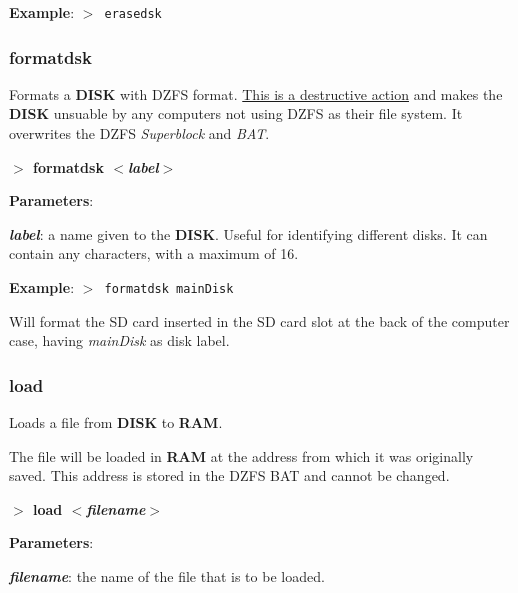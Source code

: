 \documentclass[a4paper,11pt]{article}
\begin{document}
        \textbf{Example}: \texttt{$>$ erasedsk}

        \subsubsection{{\color{blue}formatdsk}}
        Formats a \textbf{DISK} with DZFS format. \underline{This is a
        destructive action} and makes the \textbf{DISK} unsuable by any
        computers not using DZFS as their file system. It overwrites the DZFS
        \textit{Superblock} and \textit{BAT}.

        \hspace{1.9cm}\textbf{$>$ formatdsk \textit{$<$label$>$}}

        \textbf{Parameters}:

        \hspace{1cm}\textbf{\textit{label}}: a name given to the \textbf{DISK}.
        Useful for identifying different disks. It can contain any characters,
        with a maximum of 16.

        \textbf{Example}: \texttt{$>$ formatdsk mainDisk}

        Will format the SD card inserted in the SD card slot at the back of the
        computer case, having \textit{mainDisk} as disk label.

        \subsubsection{{\color{blue}load}}
        Loads a file from \textbf{DISK} to \textbf{RAM}.
        
        The file will be loaded in \textbf{RAM} at the address from which it was
        originally saved. This address is stored in the DZFS BAT and cannot be
        changed. 

        \hspace{1.9cm}\textbf{$>$ load \textit{$<$filename$>$}}

        \textbf{Parameters}:

        \hspace{1cm}\textbf{\textit{filename}}: the name of the file that is to
        be loaded.
\end{document}
